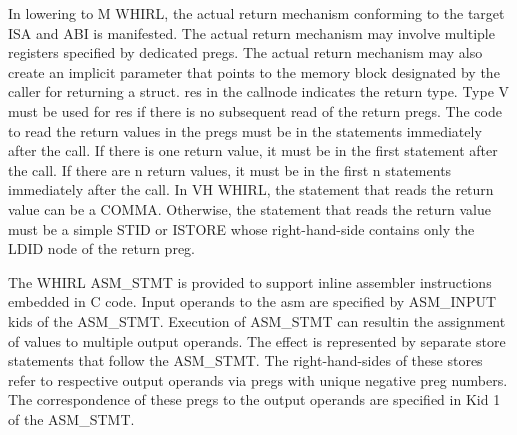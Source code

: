 In lowering to M WHIRL, the actual return mechanism conforming
to the target ISA and ABI is manifested. The actual return mechanism
may involve multiple registers specified by dedicated pregs. The
actual return mechanism may also create an implicit parameter that
points to the memory block designated by the caller for returning
a struct. res in the callnode indicates the return type. Type V
must be used for res if there is no subsequent read of the return
pregs. The code to read the return values in the pregs must be in
the statements immediately after the call. If there is one return
value, it must be in the first statement after the call. If there
are n return values, it must be in the first n statements immediately
after the call. In VH WHIRL, the statement that reads the return
value can be a
%
COMMA. Otherwise, the statement that reads the
return value must be a simple
%
STID or
%
ISTORE whose right-hand-side contains only the
%
LDID node of
the return preg.

The WHIRL 
%
ASM\_STMT is provided to support inline assembler
instructions embedded in C code. Input operands to the asm are
specified by 
%
ASM\_INPUT kids of the 
%
ASM\_STMT. Execution of 
%
ASM\_STMT
can resultin the assignment of values to multiple output operands.
The effect is represented by separate store statements that follow
the ASM\_STMT. The right-hand-sides of these stores refer to respective
output operands via pregs with unique negative preg numbers. The
correspondence of these pregs to the output operands are specified
in Kid 1 of the 
%
ASM\_STMT.


